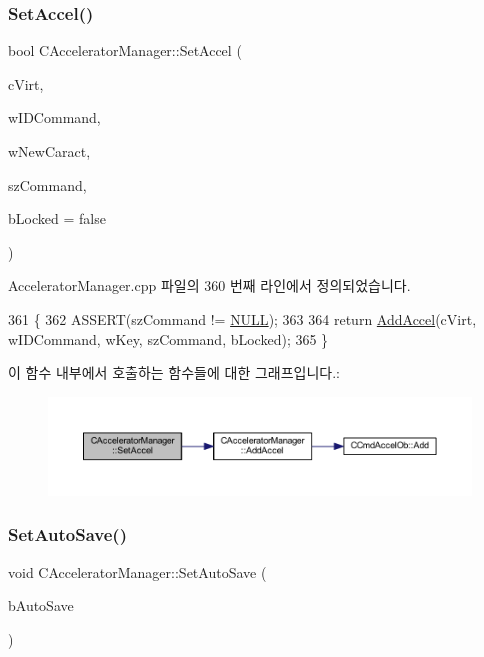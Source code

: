 \subsubsection{\texorpdfstring{Set\+Accel()}{SetAccel()}}
{\footnotesize\ttfamily bool C\+Accelerator\+Manager\+::\+Set\+Accel (\begin{DoxyParamCaption}\item[{B\+Y\+TE}]{c\+Virt,  }\item[{W\+O\+RD}]{w\+I\+D\+Command,  }\item[{W\+O\+RD}]{w\+New\+Caract,  }\item[{L\+P\+C\+T\+S\+TR}]{sz\+Command,  }\item[{bool}]{b\+Locked = {\ttfamily false} }\end{DoxyParamCaption})}



Accelerator\+Manager.\+cpp 파일의 360 번째 라인에서 정의되었습니다.


\begin{DoxyCode}
361 \{
362   ASSERT(szCommand != \mbox{\hyperlink{getopt1_8c_a070d2ce7b6bb7e5c05602aa8c308d0c4}{NULL}});
363 
364   \textcolor{keywordflow}{return} \mbox{\hyperlink{class_c_accelerator_manager_ac9e0e988625c9687666a9f582f9b3536}{AddAccel}}(cVirt, wIDCommand, wKey, szCommand, bLocked);
365 \}
\end{DoxyCode}
이 함수 내부에서 호출하는 함수들에 대한 그래프입니다.\+:
\nopagebreak
\begin{figure}[H]
\begin{center}
\leavevmode
\includegraphics[width=350pt]{class_c_accelerator_manager_a96957fd8ed0a15d0dbc508359824db3c_cgraph}
\end{center}
\end{figure}
\mbox{\label{class_c_accelerator_manager_a84b4a9dfb4afc48430655e234ff94349}} 
\subsubsection{\texorpdfstring{Set\+Auto\+Save()}{SetAutoSave()}}
{\footnotesize\ttfamily void C\+Accelerator\+Manager\+::\+Set\+Auto\+Save (\begin{DoxyParamCaption}\item[{bool}]{b\+Auto\+Save }\end{DoxyParamCaption})\hspace{0.3cm}{\ttfamily [inline]}}



